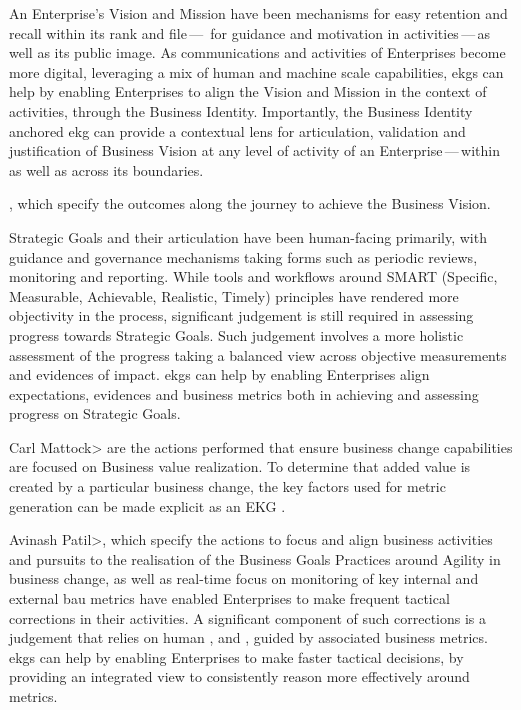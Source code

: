 An Enterprise’s Vision and Mission have been mechanisms for easy retention and recall within its rank and file\,---\,%
for guidance and motivation in activities\,---\,as well as its public image.
As communications and activities of Enterprises become more digital, leveraging a mix of human and machine scale
capabilities, \glspl{ekg} can help by enabling Enterprises to align the Vision and Mission in the context of activities,
through the Business Identity.
Importantly, the Business Identity anchored \gls{ekg} can provide a contextual lens for articulation,
validation and justification of Business Vision at any level of activity of an Enterprise\,---\,within as well as
across its boundaries.

\textbf{}, which specify the outcomes along the journey to achieve the
Business Vision.

Strategic Goals and their articulation have been human-facing primarily, with guidance and governance mechanisms
taking forms such as periodic reviews, monitoring and reporting.
While tools and workflows around SMART (Specific, Measurable, Achievable, Realistic, Timely) principles have
rendered more objectivity in the process, significant judgement is still required in assessing progress towards
Strategic Goals.
Such judgement involves a more holistic assessment of the progress taking a balanced view across objective measurements
and evidences of impact.
\Glspl{ekg} can help by enabling Enterprises align expectations, evidences and business metrics both in achieving
and assessing progress on Strategic Goals.

Carl Mattock>\textbf{} are the actions performed that ensure
business change capabilities are focused on Business value realization.
To determine that added value is created by a particular business change, the key factors used for metric generation
can be made explicit as an EKG .

Avinash Patil>\textbf{}, which specify the actions to focus and align
business activities and pursuits to the realisation of the Business Goals Practices around Agility in
business change, as well as real-time focus on monitoring of key internal and external \gls{bau} metrics have enabled
Enterprises to make frequent tactical corrections in their activities.
A significant component of such corrections is a judgement that relies on human , 
and , guided by associated business metrics.
\Glspl{ekg} can help by enabling Enterprises to make faster tactical decisions, by providing an integrated view to
consistently reason more effectively around metrics.

